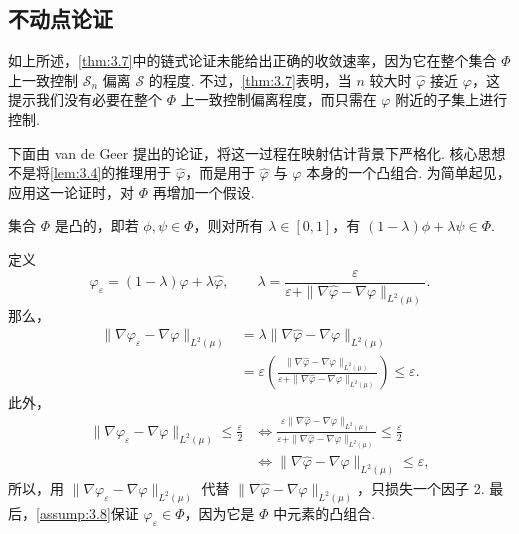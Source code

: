 \subsection{不动点论证}\label{sec:3.5}
如上所述，\autoref{thm:3.7}中的链式论证未能给出正确的收敛速率，因为它在整个集合 $\Phi$ 上一致控制 $\mathcal S_n$ 偏离 $\mathcal S$ 的程度. 不过，\autoref{thm:3.7}表明，当 $n$ 较大时 $\widehat\varphi$ 接近 $\varphi$，这提示我们没有必要在整个 $\Phi$ 上一致控制偏离程度，而只需在 $\varphi$ 附近的子集上进行控制.

下面由 van de Geer 提出的论证，将这一过程在映射估计背景下严格化. 核心思想不是将\autoref{lem:3.4}的推理用于 $\widehat\varphi$，而是用于 $\widehat\varphi$ 与 $\varphi$ 本身的一个凸组合. 为简单起见，应用这一论证时，对 $\Phi$ 再增加一个假设.
\begin{assumption}\label{assump:3.8}
集合 $\Phi$ 是凸的，即若 $\phi,\psi\in\Phi$，则对所有 $\lambda\in[0,1]$，有 $(1-\lambda)\phi+\lambda\psi\in\Phi$.
\end{assumption}
定义
$$\varphi_\varepsilon=(1-\lambda)\varphi+\lambda\widehat\varphi,
\qquad\lambda=\frac{\varepsilon}{\varepsilon+\|\nabla\widehat\varphi-\nabla\varphi\|_{L^2(\mu)}}.$$
那么，
$$\begin{aligned}
\|\nabla\varphi_\varepsilon-\nabla\varphi\|_{L^2(\mu)}
&=\lambda\|\nabla\widehat\varphi-\nabla\varphi\|_{L^2(\mu)}\\
&=\varepsilon\left(\frac{\|\nabla\widehat\varphi-\nabla\varphi\|_{L^2(\mu)}}
{\varepsilon+\|\nabla\widehat\varphi-\nabla\varphi\|_{L^2(\mu)}}\right)\le\varepsilon.
\end{aligned}$$
此外，
$$\begin{aligned}
\|\nabla\varphi_\varepsilon-\nabla\varphi\|_{L^2(\mu)}\le\frac\varepsilon2
&\iff\frac{\varepsilon\|\nabla\widehat\varphi-\nabla\varphi\|_{L^2(\mu)}}
{\varepsilon+\|\nabla\widehat\varphi-\nabla\varphi\|_{L^2(\mu)}}\le\frac\varepsilon2\\
&\iff\|\nabla\widehat\varphi-\nabla\varphi\|_{L^2(\mu)}\le\varepsilon,
\end{aligned}$$
所以，用 $\|\nabla\varphi_\varepsilon-\nabla\varphi\|_{L^2(\mu)}$ 代替 $\|\nabla\widehat\varphi-\nabla\varphi\|_{L^2(\mu)}$，只损失一个因子 2. 最后，\autoref{assump:3.8}保证 $\varphi_\varepsilon\in\Phi$，因为它是 $\Phi$ 中元素的凸组合.

